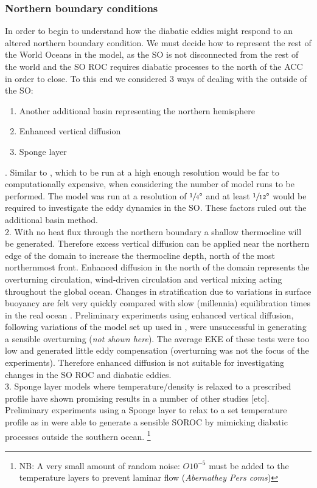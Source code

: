 \subsubsection*{Northern boundary conditions}

In order to begin to understand how the diabatic eddies might respond to an altered northern boundary condition. We must decide how to represent the rest of the World Oceans in the model, as the SO is not disconnected from the rest of the world and the SO ROC requires diabatic processes to the north of the ACC in order to close. To this end we considered 3 ways of dealing with the outside of the SO:
\singlespacing
\begin{enumerate}
\item Another additional basin representing the northern hemisphere
\item Enhanced vertical diffusion 
\item Sponge layer
\end{enumerate}

. Similar to \citet{saenz2012}, which to be run at a high enough resolution would be far to computationally expensive, when considering the number of model runs to be performed. The \citet{saenz2012} model was run at a resolution of $\displaystyle{\sfrac{1}{4}\degree}$ and at least $\displaystyle{\sfrac{1}{12}\degree}$ would be required to investigate the eddy dynamics in the SO. These factors ruled out the additional basin method.\\
2.  With no heat flux through the northern boundary a
shallow thermocline will be generated. Therefore excess vertical diffusion can be applied near the northern edge of the domain to increase the thermocline depth, north of the most northernmost front. Enhanced diffusion in the north of the domain represents the overturning circulation,
wind-driven circulation and vertical mixing acting throughout the global ocean.
Changes in stratification due to variations in surface buoyancy are felt very quickly
compared with slow (millennia) equilibration times in the real ocean \citet{allison2010}. Preliminary experiments using enhanced vertical diffusion, following variations of the model set up used in \citet{hogg2010}, were unsuccessful in generating a sensible overturning (\textit{not shown here}). The average \gls{EKE} of these tests were too low and generated little eddy compensation (overturning was not the focus of the \citet{hogg2010} experiments). Therefore enhanced diffusion is not suitable for investigating changes in the SO ROC and diabatic eddies. \\
3. Sponge layer models where temperature/density is relaxed to a prescribed profile have shown promising results in a number of other studies \citep{Abernathey2011,Abernathey2014,Zhai2014}[etc]. Preliminary experiments using a Sponge layer to relax to a set temperature profile as in \citet{Abernathey2011} were able to generate a sensible \gls{SOROC} by mimicking diabatic processes outside the southern ocean. \footnote{NB: A very small amount of random noise: $O 10^{-5}$ must be added to the temperature layers to prevent laminar flow (\textit{Abernathey Pers coms}) }

